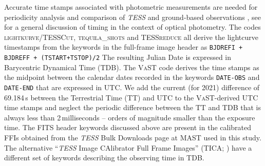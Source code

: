 \documentclass[twocolumn]{aastex631}
\begin{document}
Accurate time stamps associated with photometric measurements are needed for periodicity
analysis and comparison of {\em TESS} and ground-based observations
\citep[e.g.,][]{2020AJ....160...34V}, see \cite{2010PASP..122..935E} for a general
discussion of timing in the context of optical photometry. 
The codes \textsc{lightkurve}/\textsc{TESSCut}, \textsc{tequila\_shots} and \textsc{TESSreduce}
all derive the lightcurve timestamps from the keywords in the full-frame
image header as 
\texttt{BJDREFI + BJDREFF + (TSTART+TSTOP)/2}
The resulting Julian Date is expressed in Barycentric Dynamical Time (TDB).
The \textsc{VaST} code derives the time stamps as the midpoint between the
calendar dates recorded in the keywords
\texttt{DATE-OBS} and \texttt{DATE-END}
that are expressed in UTC.
We add the current (for 2021) difference of 69.184\,s between the Terrestrial Time (TT) and UTC
to the \textsc{VaST}-derived UTC time stamps and neglect the periodic difference
between the TT and TDB that is always less than 2\,milliseconds -- orders of
magnitude smaller than the exposure time.
%
The FITS header keywords discussed above are present in the calibrated FFIs
obtained from the {\em TESS} Bulk Downloads page at 
MAST %
used in this study.
The alternative ``{\em TESS} Image CAlibrator Full Frame Images'' (TICA;
\citealt{2020RNAAS...4..251F}) have a different set of keywords describing
the observing time in TDB.



{}



\end{document}

